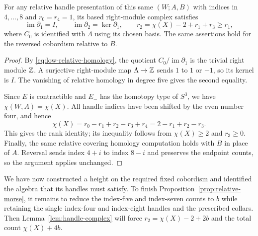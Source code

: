 \begin{lemma}
\label{lem:handle-complex}
For any relative handle presentation of this same $(W;A,B)$ with
indices in $4,\ldots,8$ and $r_0=r_4=1$, its based right-module
complex satisfies
\begin{equation}
 \operatorname{im}\partial_1=I,
 \qquad
 \operatorname{im}\partial_2=\ker\partial_1,
 \qquad
 r_2=\chi(X)-2+r_1+r_3\geq r_1,
 \label{eq:handle-identities}
\end{equation}
where $C_0$ is identified with $\Lambda$ using its chosen basis.
The same assertions hold for the reversed cobordism relative to $B$.
\end{lemma}

\begin{proof}
By \eqref{eq:low-relative-homology}, the quotient
$C_0/\operatorname{im}\partial_1$ is the trivial right module $\mathbb Z$.
A surjective right-module map $\Lambda\to\mathbb Z$ sends $1$ to $1$ or
$-1$, so its kernel is $I$.  The vanishing of relative homology in
degree five gives the second equality.

Since $E$ is contractible and $E_-$ has the homotopy type of $S^3$,
we have $\chi(W,A)=\chi(X)$.  All handle indices have been shifted
by the even number four, and hence
\[
 \chi(X)=r_0-r_1+r_2-r_3+r_4
         =2-r_1+r_2-r_3.
\]
This gives the rank identity; its inequality follows from
$\chi(X)\geq2$ and $r_3\geq0$.  Finally, the same relative covering
homology computation holds with $B$ in place of $A$.  Reversal sends
index $4+i$ to index $8-i$ and preserves the endpoint counts, so the
argument applies unchanged.
\end{proof}

We have now constructed a height on the required fixed cobordism
and identified the algebra that its handles must satisfy.  To finish
Proposition~\ref{prop:relative-morse}, it remains to reduce the
index-five and index-seven counts to $b$ while retaining the single
index-four and index-eight handles and the prescribed collars.
Then Lemma~\ref{lem:handle-complex} will force
$r_2=\chi(X)-2+2b$ and the total count $\chi(X)+4b$.
